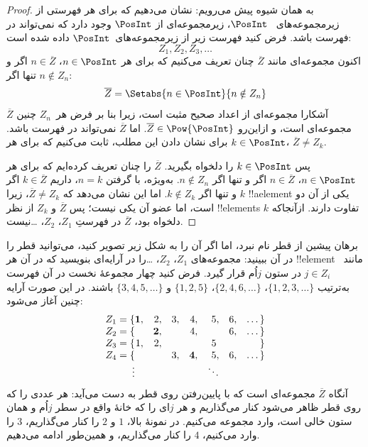 \documentclass[../../../include/open-logic-section]{subfiles}
\begin{document}
\begin{proof}
به همان شیوه پیش می‌رویم: نشان می‌دهیم که برای هر فهرستی از زیرمجموعه‌های
~$\PosInt$، زیرمجموعه‌ای از $\PosInt$ وجود دارد که نمی‌تواند در فهرست
باشد. فرض کنید فهرست زیر از زیرمجموعه‌های~$\PosInt$ داده شده است:
\[
Z_{1}, Z_{2}, Z_{3}, \dots
\]
اکنون مجموعه‌ای مانند $\overline{Z}$ چنان تعریف می‌کنیم که برای هر
$n \in \PosInt$، $n \in \overline{Z}$ اگر و تنها اگر $n \notin Z_{n}$:
\[
\overline{Z} = \Setabs{n \in \PosInt}{n \notin Z_n}
\]
$\overline{Z}$ آشکارا مجموعه‌ای از اعداد صحیح مثبت است، زیرا بنا بر
فرض هر~$Z_n$ چنین مجموعه‌ای است، و ازاین‌رو $\overline{Z} \in
\Pow{\PosInt}$. اما $\overline{Z}$ نمی‌تواند در فهرست باشد. برای نشان
دادن این مطلب، ثابت می‌کنیم که برای هر $k \in \PosInt$، $\overline{Z} \neq
Z_k$.

پس $k \in \PosInt$ را دلخواه بگیرید. $\overline{Z}$ را چنان تعریف
کرده‌ایم که برای هر $n \in \PosInt$، $n \in \overline{Z}$ اگر و تنها
اگر $n \notin Z_n$. به‌ویژه، با گرفتن $n=k$، داریم $k \in \overline{Z}$
اگر و تنها اگر $k \notin Z_k$. اما این نشان می‌دهد که
$\overline{Z} \neq Z_k$، زیرا $k$ !!a{element} یکی از آن دو است، اما عضو
آن یکی نیست؛ پس $\overline{Z}$ و $Z_k$ از نظر !!{element}s تفاوت دارند.
ازآنجاکه $k$ دلخواه بود، $\overline{Z}$ در فهرستِ $Z_1$، $Z_2$،
\dots نیست.
\end{proof}

\begin{explain}
برهان پیشین از قطر نام نبرد، اما اگر آن را به شکل زیر تصویر کنید،
می‌توانید قطر را در آن ببینید: مجموعه‌های $Z_1$، $Z_2$، \dots را در
آرایه‌ای بنویسید که در آن هر !!{element} مانند~$j \in Z_i$ در ستون
$j$اُم قرار گیرد. فرض کنید چهار مجموعهٔ نخست در آن فهرست به‌ترتیب
$\{1,2,3,\dots\}$، $\{2, 4, 6, \dots\}$، $\{1,2,5\}$ و
$\{3,4,5,\dots\}$ باشند. در این صورت آرایه چنین آغاز می‌شود:
\[
\begin{array}{r@{}rrrrrrr}
  Z_1 = \{ & \mathbf{1}, & 2, & 3, & 4, & 5, & 6, & \dots\}\\
  Z_2 = \{ &  & \mathbf{2}, &  & 4, &  & 6, & \dots\}\\
  Z_3 = \{ & 1, & 2, &  &  & 5\phantom{,} &  & \}\\
  Z_4 = \{ &  &  & 3, & \mathbf{4}, & 5, & 6, & \dots\}\\
  \vdots & & & & & \ddots
\end{array}
\]
آنگاه $\overline{Z}$ مجموعه‌ای است که با پایین‌رفتن روی قطر به دست
می‌آید: هر عددی را که روی قطر ظاهر می‌شود کنار می‌گذاریم و هر $j$ای را
که خانهٔ واقع در سطر $j$اُم و همان ستون خالی است، وارد مجموعه می‌کنیم. در نمونهٔ
بالا، $1$ و $2$ را کنار می‌گذاریم، $3$ را وارد می‌کنیم، $4$ را کنار
می‌گذاریم، و همین‌طور ادامه می‌دهیم.
\end{explain}
\end{document}
